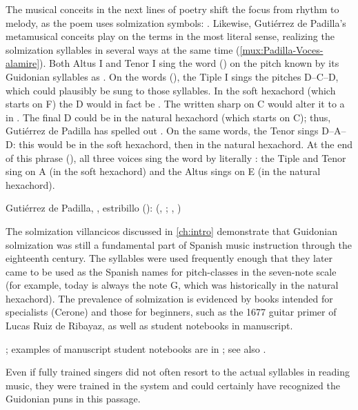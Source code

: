 The musical conceits in the next lines of poetry shift the focus from rhythm to
melody, as the poem uses solmization symbols: .
Likewise, Gutiérrez de Padilla's metamusical conceits play on the terms in the
most literal sense, realizing the solmization syllables in several ways at the
same time (\cref{mux:Padilla-Voces-alamire}).
Both Altus I and Tenor I sing the word  () on the pitch
known by its Guidonian syllables as .
On the words  (), the Tiple I sings the
pitches D--C\sh{}--D, which could plausibly be sung to those syllables.
In the soft hexachord (which starts on F) the D would in fact be .
The written sharp on C would alter it to a  in . 
The final D could be  in the natural hexachord (which starts on C);
thus, Gutiérrez de Padilla has spelled out .
On the same words, the Tenor sings D--A--D: this would be  in the
soft hexachord, then  in the natural hexachord.
At the end of this phrase (), all three voices sing the word
 by literally : the Tiple and
Tenor sing  on A (in the soft hexachord) and the Altus sings 
on E (in the natural hexachord).

{Gutiérrez de Padilla, , estribillo
():  (,
; , )}

The solmization villancicos discussed in \cref{ch:intro} demonstrate that
Guidonian solmization was still a fundamental part of Spanish music instruction
through the eighteenth century. 
The syllables were used frequently enough that they later came to be used as
the Spanish names for pitch-classes in the seven-note scale (for example,
 today is always the note G, which was historically  in the
natural hexachord).
The prevalence of solmization is evidenced by books intended for specialists
(Cerone) and those for beginners, such as the 1677 guitar primer of
Lucas Ruiz de Ribayaz, as well as student notebooks in manuscript.%
\begin{Footnote}
    \Autocite{Ruiz:Luz}; examples of manuscript student notebooks are in
    ; see also \autocite{Cohen:NotesMiddleAges}.
\end{Footnote}
Even if fully trained singers did not often resort to the actual syllables in
reading music, they were trained in the system and could certainly have
recognized the Guidonian puns in this passage.

